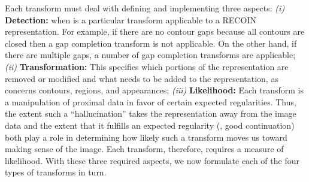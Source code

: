 
Each transform must deal with defining and implementing three aspects: \emph{(i)} {\bf Detection:} when is a particular transform applicable to a RECOIN representation. For example, if there are no contour gaps because all contours are closed then a gap completion transform is not applicable. On the other hand, if there are multiple gaps, a number of gap completion transforms are applicable; \emph{(ii)} {\bf Transformation:}  This specifies which portions of the representation are removed or modified and what needs to be added to the representation, as concerns contours, regions, and appearances; \emph{(iii)} {\bf Likelihood:} Each transform is a manipulation of proximal data in favor of certain expected regularities. Thus, the extent such a ``hallucination'' takes the representation away from the image data and the extent that it fulfills an expected regularity  (\eg, good continuation) both play a role in determining how likely such a transform moves us toward making sense of the image. Each transform, therefore, requires a measure of likelihood. With these three required aspects, we now formulate each of the four types of transforms in turn. 


